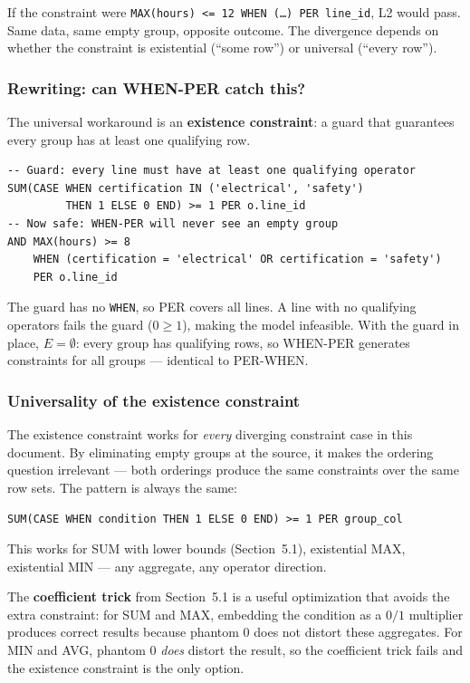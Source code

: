 \documentclass[11pt]{article}
\begin{document}
If the constraint were \texttt{MAX(hours) <= 12 WHEN (\ldots) PER
line\_id}, L2 would pass. Same data, same empty group, opposite outcome.
The divergence depends on whether the constraint is existential (``some
row'') or universal (``every row'').

\subsubsection*{Rewriting: can WHEN-PER catch this?}

The universal workaround is an \textbf{existence constraint}: a guard that
guarantees every group has at least one qualifying row.

\begin{lstlisting}
-- Guard: every line must have at least one qualifying operator
SUM(CASE WHEN certification IN ('electrical', 'safety')
         THEN 1 ELSE 0 END) >= 1 PER o.line_id
-- Now safe: WHEN-PER will never see an empty group
AND MAX(hours) >= 8
    WHEN (certification = 'electrical' OR certification = 'safety')
    PER o.line_id
\end{lstlisting}

The guard has no \texttt{WHEN}, so PER covers all lines. A line with no
qualifying operators fails the guard ($0 \geq 1$), making the model
infeasible. With the guard in place, $E = \emptyset$: every group has
qualifying rows, so WHEN-PER generates constraints for all groups ---
identical to PER-WHEN.

\subsubsection*{Universality of the existence constraint}

The existence constraint works for \emph{every} diverging constraint case
in this document. By eliminating empty groups at the source, it makes the
ordering question irrelevant --- both orderings produce the same constraints
over the same row sets. The pattern is always the same:

\begin{center}
\texttt{SUM(CASE WHEN condition THEN 1 ELSE 0 END) >= 1 PER group\_col}
\end{center}

This works for SUM with lower bounds (Section~5.1), existential MAX,
existential MIN --- any aggregate, any operator direction.

The \textbf{coefficient trick} from Section~5.1 is a useful optimization
that avoids the extra constraint: for SUM and MAX, embedding the condition
as a $0/1$ multiplier produces correct results because phantom 0 does not
distort these aggregates. For MIN and AVG, phantom 0 \emph{does} distort
the result, so the coefficient trick fails and the existence constraint is
the only option.
\end{document}
